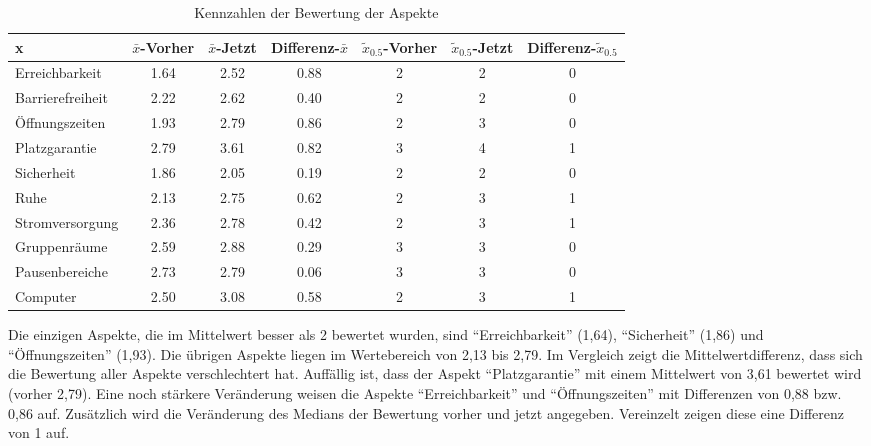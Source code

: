 \documentclass[11pt, a4paper]{article}
\begin{document}
\begin{table}[h]
	\vspace*{0cm}
	\hspace*{0.48cm}
	\begin{tabular}{l|cccccc}
		x                & $\bar{x}$-Vorher & $\bar{x}$-Jetzt & Differenz-$\bar{x}$ & $\tilde{x}_{0.5}$-Vorher & $\tilde{x}_{0.5}$-Jetzt & Differenz-$\tilde{x}_{0.5}$\\ \hline
		Erreichbarkeit   & 1.64              & 2.52             & 0.88                 & 2             & 2            & 0                     \\
		Barrierefreiheit & 2.22              & 2.62             & 0.40                 & 2             & 2            & 0                     \\
		Öffnungszeiten   & 1.93              & 2.79             & 0.86                 & 2             & 3            & 0                     \\
		Platzgarantie    & 2.79              & 3.61             & 0.82                 & 3             & 4            & 1                     \\
		Sicherheit       & 1.86              & 2.05             & 0.19                 & 2             & 2            & 0                     \\
		Ruhe             & 2.13              & 2.75             & 0.62                 & 2             & 3            & 1                     \\
		Stromversorgung  & 2.36              & 2.78             & 0.42                 & 2             & 3            & 1                     \\
		Gruppenräume     & 2.59              & 2.88             & 0.29                 & 3             & 3            & \multicolumn{1}{c}{0} \\
		Pausenbereiche   & 2.73              & 2.79             & 0.06                 & 3             & 3            & 0                     \\
		Computer         & 2.50              & 3.08             & 0.58                 & 2             & 3            & 1                    
	\end{tabular}
			\caption{Kennzahlen der Bewertung der Aspekte}
\end{table}

\newpage


Die einzigen Aspekte, die im Mittelwert besser als 2 bewertet wurden, sind “Erreichbarkeit” (1,64), “Sicherheit” (1,86) und “Öffnungszeiten” (1,93). Die übrigen Aspekte liegen im Wertebereich von 2,13 bis 2,79.
Im Vergleich zeigt die Mittelwertdifferenz, dass sich die Bewertung aller Aspekte verschlechtert hat. Auffällig ist, dass der Aspekt “Platzgarantie” mit einem Mittelwert von 3,61 bewertet wird (vorher 2,79). Eine noch stärkere Veränderung weisen die Aspekte “Erreichbarkeit” und “Öffnungszeiten” mit Differenzen von 0,88 bzw. 0,86 auf.
Zusätzlich wird die Veränderung des Medians der Bewertung vorher und jetzt angegeben. Vereinzelt zeigen diese eine Differenz von 1 auf.
\end{document}
